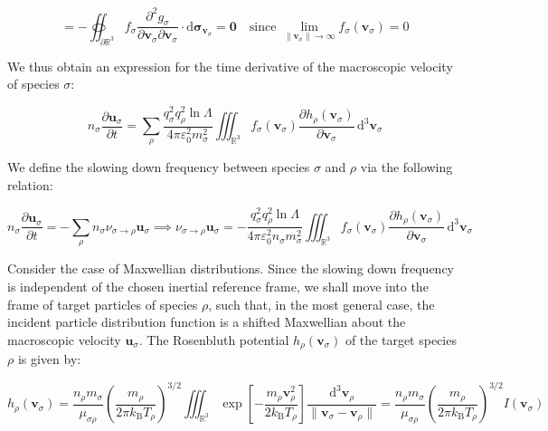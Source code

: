 \fi

\begin{equation}
    =-\oiint_{\partial\mathbb{R}^3}f_\sigma\frac{\partial^2g_\sigma}{\partial\mathbf{v}_\sigma\partial\mathbf{v}_\sigma}\cdot\mathrm{d}\boldsymbol{\sigma}_{\mathbf{v}_\sigma}=\mathbf{0}\quad\text{since }\lim_{\|\mathbf{v}_\sigma\|\to\infty}f_\sigma(\mathbf{v}_\sigma)=0
\end{equation}

We thus obtain an expression for the time derivative of the macroscopic velocity of species $\sigma$:

\begin{equation}
    n_\sigma\frac{\partial\mathbf{u}_\sigma}{\partial t}=\sum_\rho\frac{q_\sigma^2q_\rho^2\ln{\Lambda}}{4\pi\varepsilon_0^2m_\sigma^2}\iiint_{\mathbb{R}^3}f_\sigma(\mathbf{v}_\sigma)\frac{\partial h_\rho(\mathbf{v}_\sigma)}{\partial\mathbf{v}_\sigma}\,\mathrm{d}^3\mathbf{v}_\sigma
\end{equation}

We define the slowing down frequency between species $\sigma$ and $\rho$ via the following relation:

\begin{equation}
    n_\sigma\frac{\partial\mathbf{u}_\sigma}{\partial t}=-\sum_{\rho}n_\sigma\nu_{\sigma\to\rho}\mathbf{u}_\sigma\implies\nu_{\sigma\to\rho}\mathbf{u}_\sigma=-\frac{q_\sigma^2q_\rho^2\ln{\Lambda}}{4\pi\varepsilon_0^2n_\sigma m_\sigma^2}\iiint_{\mathbb{R}^3}f_\sigma(\mathbf{v}_\sigma)\frac{\partial h_\rho(\mathbf{v}_\sigma)}{\partial\mathbf{v}_\sigma}\,\mathrm{d}^3\mathbf{v}_\sigma
\end{equation}

Consider the case of Maxwellian distributions. Since the slowing down frequency is independent of the chosen inertial reference frame, we shall move into the frame of target particles of species $\rho$, such that, in the most general case, the incident particle distribution function is a shifted Maxwellian about the macroscopic velocity $\mathbf{u}_\sigma$. The Rosenbluth potential $h_\rho(\mathbf{v}_\sigma)$ of the target species $\rho$ is given by:

\begin{equation}
    h_\rho(\mathbf{v}_\sigma)=\frac{n_\rho m_\sigma}{\mu_{\sigma\rho}}\left(\frac{m_\rho}{2\pi k_\mathrm{B}T_\rho}\right)^{3/2}\iiint_{\mathbb{R}^3}\exp{\left[-\frac{m_\rho\mathbf{v}_\rho^2}{2k_\mathrm{B}T_\rho}\right]}\frac{\mathrm{d}^3\mathbf{v}_\rho}{\|\mathbf{v}_\sigma-\mathbf{v}_\rho\|}=\frac{n_\rho m_\sigma}{\mu_{\sigma\rho}}\left(\frac{m_\rho}{2\pi k_\mathrm{B}T_\rho}\right)^{3/2}I(\mathbf{v}_\sigma)
\end{equation}

